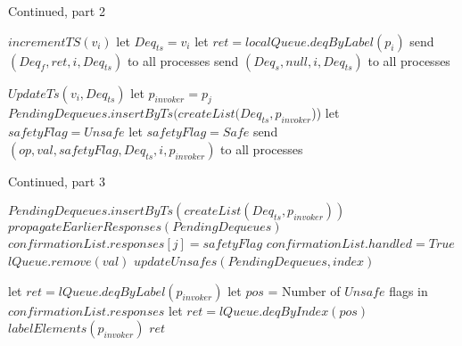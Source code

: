 \documentclass[a4paper,USenglish]{lipics-v2021} %
\begin{document}
\begin{algorithm}
  \caption{Continued, part 2}
  \begin{algorithmic}[1]
      \State $incrementTS(v_i)$
      \State let $Deq_{ts} = v_i$
        \State let $ret = localQueue.deqByLabel(p_i)$
        \State send $(Deq_f, ret, i, Deq_{ts})$ to all processes
      \Else
        \State send $(Deq_s, null, i, Deq_{ts})$ to all processes
      \EndIf
    \EndFunction

      \State $UpdateTs(v_i, Deq_{ts})$
      \State let $p_{invoker} = p_j$
      \State $PendingDequeues.insertByTs(createList(Deq_{ts}, p_{invoker}$))
      \EndIf
        \State let $safetyFlag = Unsafe$
      \Else
        \State let $safetyFlag = Safe$
      \EndIf
      \State send $(op, val, safetyFlag, Deq_{ts}, i, p_{invoker})$ to all processes
    \EndFunction

  \end{algorithmic}
\end{algorithm}

\begin{algorithm}
  \caption{Continued, part 3}
  \begin{algorithmic}[1]
        \State $PendingDequeues.insertByTs(createList(Deq_{ts}, p_{invoker}))$
      \EndIf
      \State $propagateEarlierResponses(PendingDequeues)$ 
          \State $confirmationList.responses[j] = safetyFlag$
        \EndIf 
          \State $confirmationList.handled = True$ 
            \State $lQueue.remove(val)$
          \EndIf 
          \State $updateUnsafes(PendingDequeues, index)$
           
            \State \Return
          \EndIf

          \State let $ret = lQueue.deqByLabel(p_{invoker})$
          \Else 
            \State let $pos$ = Number of $Unsafe$ flags in $confirmationList.responses$
            \State let $ret = lQueue.deqByIndex(pos)$
          \EndIf
          \State $labelElements(p_{invoker})$
            \State \Return $ret$
          \EndIf
        \EndIf 
      \EndFor
    \EndFunction
  \end{algorithmic}
\end{algorithm}
\end{document}
